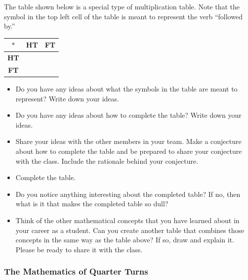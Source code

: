 \documentclass[11pt]{article}
\newenvironment{task}
	{\begin{mdframed}[linecolor=lightgray, linewidth=3pt]\raggedright}
	{\end{mdframed}}
\theoremstyle{definition}
\begin{document}
The table shown below is a special type of multiplication table. Note that the symbol in the top left cell of the table is meant to represent the verb ``followed by.''
\begin{center}
  \begin{tabular}{|c|c|c|}\hline
    $\ast$      & \textbf{HT} & \textbf{FT} \\ \hline
    \textbf{HT} &             & \\ \hline
    \textbf{FT} &             & \\  \hline
  \end{tabular}
\end{center}
\begin{task}
\begin{itemize}
  \item Do you have any ideas about what the symbols in the table are meant to represent? Write down your ideas.
  \item Do you have any ideas about how to complete the table? Write down your ideas.
  \item Share your ideas with the other members in your team. Make a conjecture about how to complete the table and be prepared to share your conjecture with the class. Include the rationale behind your conjecture.
  \item Complete the table.
  \item Do you notice anything interesting about the completed table? If no, then what is it that makes the completed table so dull?
  \item Think of the other mathematical concepts that you have learned about in your career as a student. Can you create another table that combines those concepts in the 
    same way as the table above? If so, draw and explain it. Please be ready to share it with the class.
\end{itemize}
\end{task}

\subsubsection{The Mathematics of Quarter Turns}
\end{document}
